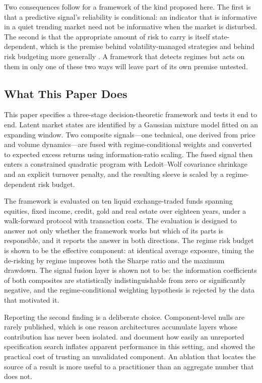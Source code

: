 \documentclass{singlecol-new}
\theoremstyle{TH}{
\newtheorem{lemma}{Lemma}
\newtheorem{theorem}[lemma]{Theorem}
\newtheorem{corrolary}[lemma]{Corrolary}
\newtheorem{conjecture}[lemma]{Conjecture}
\newtheorem{proposition}[lemma]{Proposition}
\newtheorem{claim}[lemma]{Claim}
\newtheorem{stheorem}[lemma]{Wrong Theorem}
\newtheorem{algorithm}{Algorithm}
}
\theoremstyle{THrm}{
\newtheorem{definition}{Definition}[section]
\newtheorem{question}{Question}[section]
\newtheorem{remark}{Remark}
\newtheorem{scheme}{Scheme}
}
\theoremstyle{THhit}{
\newtheorem{case}{Case}[section]
}
\begin{document}
Two consequences follow for a framework of the kind proposed here. The first is that a
predictive signal's reliability is conditional: an indicator that is informative in a
quiet trending market need not be informative when the market is disturbed. The second
is that the appropriate amount of risk to carry is itself state-dependent, which is the
premise behind volatility-managed strategies \citep{moreira17, hood25} and behind risk
budgeting more generally \citep{asimit25}. A framework that detects regimes but acts on
them in only one of these two ways will leave part of its own premise untested.

\subsection{What This Paper Does}

This paper specifies a three-stage decision-theoretic framework and tests it end to
end. Latent market states are identified by a Gaussian mixture model fitted on an
expanding window. Two composite signals---one technical, one derived from price and
volume dynamics---are fused with regime-conditional weights and converted to expected
excess returns using information-ratio scaling. The fused signal then enters a
constrained quadratic program with Ledoit--Wolf covariance shrinkage
\citep{ledoit04} and an explicit turnover penalty, and the resulting sleeve is scaled by
a regime-dependent risk budget.

The framework is evaluated on ten liquid exchange-traded funds spanning equities, fixed
income, credit, gold and real estate over eighteen years, under a walk-forward protocol
with transaction costs. The evaluation is designed to answer not only whether the
framework works but which of its parts is responsible, and it reports the answer in
both directions. The regime risk budget is shown to be the effective component: at
identical average exposure, timing the de-risking by regime improves both the Sharpe
ratio and the maximum drawdown. The signal fusion layer is shown not to be: the
information coefficients of both composites are statistically indistinguishable from
zero or significantly negative, and the regime-conditional weighting hypothesis is
rejected by the data that motivated it.

Reporting the second finding is a deliberate choice. Component-level nulls are rarely
published, which is one reason architectures accumulate layers whose contribution has
never been isolated. \citet{harvey15} and \citet{valls26} document how easily an
unreported specification search inflates apparent performance in this setting, and
\citet{demiguel09} showed the practical cost of trusting an unvalidated component. An
ablation that locates the source of a result is more useful to a practitioner than an
aggregate number that does not.
\end{document}
